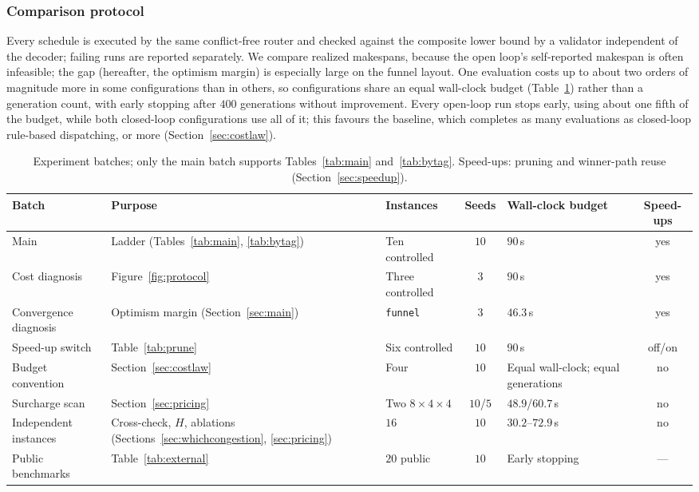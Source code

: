 \documentclass[preprint,review,12pt,authoryear,doubleblind]{elsarticle}
\newcommand{\NSeeds}{10}
\newcommand{\MatrixCells}{16}
\newcommand{\PubNInst}{20}
\begin{document}
\subsubsection{Comparison protocol}
\label{sec:protocol}

Every schedule is executed by the same conflict-free router and checked against the composite lower bound by a validator independent of the decoder; failing runs are reported separately.
We compare realized makespans, because the open loop's self-reported makespan is often infeasible; the gap (hereafter, the optimism margin) is especially large on the funnel layout.
One evaluation costs up to about two orders of magnitude more in some configurations than in others, so configurations share an equal wall-clock budget (Table~\ref{tab:batches}) rather than a generation count, with early stopping after $400$ generations without improvement.
Every open-loop run stops early, using about one fifth of the budget, while both closed-loop configurations use all of it; this favours the baseline, which completes as many evaluations as closed-loop rule-based dispatching, or more (Section~\ref{sec:costlaw}).

\begin{table}[!htbp]
\caption{Experiment batches; only the main batch supports Tables~\ref{tab:main} and~\ref{tab:bytag}. Speed-ups: pruning and winner-path reuse (Section~\ref{sec:speedup}).}
\label{tab:batches}
\footnotesize
\begin{adjustbox}{max width=\linewidth}\begin{tabular}{@{}>{\raggedright\arraybackslash}p{2.3cm}>{\raggedright\arraybackslash}p{3.2cm}>{\raggedright\arraybackslash}p{2.1cm}c>{\raggedright\arraybackslash}p{2.4cm}c@{}}
\toprule
Batch & Purpose & Instances & Seeds & Wall-clock budget & Speed-ups \\
\midrule
Main & Ladder (Tables~\ref{tab:main}, \ref{tab:bytag}) & Ten controlled & $\NSeeds$ & $90$\,s & yes \\
Cost diagnosis & Figure~\ref{fig:protocol} & Three controlled & $3$ & $90$\,s & yes \\
Convergence diagnosis & Optimism margin (Section~\ref{sec:main}) & \texttt{funnel} & $3$ & $46.3$\,s & yes \\
Speed-up switch & Table~\ref{tab:prune} & Six controlled & $10$ & $90$\,s & off/on \\
Budget convention & Section~\ref{sec:costlaw} & Four & $10$ & Equal wall-clock; equal generations & no \\
Surcharge scan & Section~\ref{sec:pricing} & Two $8\times4\times4$ & $10$/$5$ & $48.9$/$60.7$\,s & no \\
Independent instances & Cross-check, $H$, ablations (Sections~\ref{sec:whichcongestion}, \ref{sec:pricing}) & $\MatrixCells$ & $10$ & $30.2$--$72.9$\,s & no \\
Public benchmarks & Table~\ref{tab:external} & $\PubNInst$ public & $\NSeeds$ & Early stopping & --- \\
\bottomrule
\end{tabular}\end{adjustbox}
\end{table}
\end{document}

